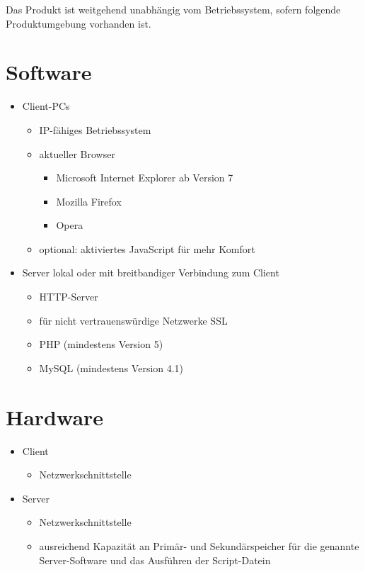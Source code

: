 \documentclass[a4paper,oneside]{scrreprt}
\begin{document}
Das Produkt ist weitgehend unabhängig vom Betriebssystem, sofern folgende Produktumgebung vorhanden ist.

\section{Software}

\begin{itemize}
\item Client-PCs
    \begin{itemize}
    \item IP-fähiges Betriebssystem
    \item aktueller Browser
        \begin{itemize}
        \item Microsoft Internet Explorer ab Version 7
        \item Mozilla Firefox
        \item Opera
        \end{itemize}
    \item optional: aktiviertes JavaScript für mehr Komfort
    \end{itemize}

\item Server lokal oder mit breitbandiger Verbindung zum Client
    \begin{itemize}
    \item HTTP-Server
    \item für nicht vertrauenswürdige Netzwerke SSL
    \item PHP (mindestens Version 5)
    \item MySQL (mindestens Version 4.1)
    \end{itemize}
\end{itemize}

\section{Hardware}

\begin{itemize}
\item Client
    \begin{itemize}
    \item Netzwerkschnittstelle
    \end{itemize}
\item Server
    \begin{itemize}
    \item Netzwerkschnittstelle
    \item ausreichend Kapazität an Primär- und Sekundärspeicher für die genannte Server-Software und das Ausführen der Script-Datein
    \end{itemize}
\end{itemize}
\end{document}
